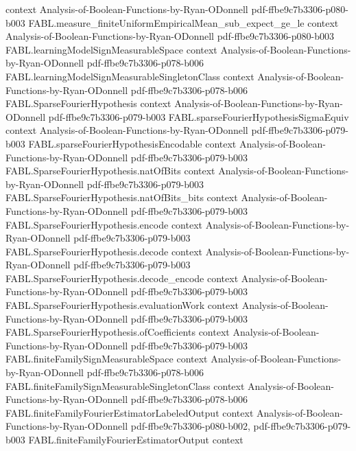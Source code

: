 \begin{theorem}
  {context}
  {Analysis-of-Boolean-Functions-by-Ryan-ODonnell}
  {pdf-ffbe9c7b3306-p080-b003}
\proofstep
  {FABL.measure_finiteUniformEmpiricalMean_sub_expect_ge_le}
  {context}
  {Analysis-of-Boolean-Functions-by-Ryan-ODonnell}
  {pdf-ffbe9c7b3306-p080-b003}
\proofstep
  {FABL.learningModelSignMeasurableSpace}
  {context}
  {Analysis-of-Boolean-Functions-by-Ryan-ODonnell}
  {pdf-ffbe9c7b3306-p078-b006}
\proofstep
  {FABL.learningModelSignMeasurableSingletonClass}
  {context}
  {Analysis-of-Boolean-Functions-by-Ryan-ODonnell}
  {pdf-ffbe9c7b3306-p078-b006}
\proofstep
  {FABL.SparseFourierHypothesis}
  {context}
  {Analysis-of-Boolean-Functions-by-Ryan-ODonnell}
  {pdf-ffbe9c7b3306-p079-b003}
\proofstep
  {FABL.sparseFourierHypothesisSigmaEquiv}
  {context}
  {Analysis-of-Boolean-Functions-by-Ryan-ODonnell}
  {pdf-ffbe9c7b3306-p079-b003}
\proofstep
  {FABL.sparseFourierHypothesisEncodable}
  {context}
  {Analysis-of-Boolean-Functions-by-Ryan-ODonnell}
  {pdf-ffbe9c7b3306-p079-b003}
\proofstep
  {FABL.SparseFourierHypothesis.natOfBits}
  {context}
  {Analysis-of-Boolean-Functions-by-Ryan-ODonnell}
  {pdf-ffbe9c7b3306-p079-b003}
\proofstep
  {FABL.SparseFourierHypothesis.natOfBits_bits}
  {context}
  {Analysis-of-Boolean-Functions-by-Ryan-ODonnell}
  {pdf-ffbe9c7b3306-p079-b003}
\proofstep
  {FABL.SparseFourierHypothesis.encode}
  {context}
  {Analysis-of-Boolean-Functions-by-Ryan-ODonnell}
  {pdf-ffbe9c7b3306-p079-b003}
\proofstep
  {FABL.SparseFourierHypothesis.decode}
  {context}
  {Analysis-of-Boolean-Functions-by-Ryan-ODonnell}
  {pdf-ffbe9c7b3306-p079-b003}
\proofstep
  {FABL.SparseFourierHypothesis.decode_encode}
  {context}
  {Analysis-of-Boolean-Functions-by-Ryan-ODonnell}
  {pdf-ffbe9c7b3306-p079-b003}
\proofstep
  {FABL.SparseFourierHypothesis.evaluationWork}
  {context}
  {Analysis-of-Boolean-Functions-by-Ryan-ODonnell}
  {pdf-ffbe9c7b3306-p079-b003}
\proofstep
  {FABL.SparseFourierHypothesis.ofCoefficients}
  {context}
  {Analysis-of-Boolean-Functions-by-Ryan-ODonnell}
  {pdf-ffbe9c7b3306-p079-b003}
\proofstep
  {FABL.finiteFamilySignMeasurableSpace}
  {context}
  {Analysis-of-Boolean-Functions-by-Ryan-ODonnell}
  {pdf-ffbe9c7b3306-p078-b006}
\proofstep
  {FABL.finiteFamilySignMeasurableSingletonClass}
  {context}
  {Analysis-of-Boolean-Functions-by-Ryan-ODonnell}
  {pdf-ffbe9c7b3306-p078-b006}
\proofstep
  {FABL.finiteFamilyFourierEstimatorLabeledOutput}
  {context}
  {Analysis-of-Boolean-Functions-by-Ryan-ODonnell}
  {pdf-ffbe9c7b3306-p080-b002,
    pdf-ffbe9c7b3306-p079-b003}
\proofstep
  {FABL.finiteFamilyFourierEstimatorOutput}
  {context}

\end{theorem}
